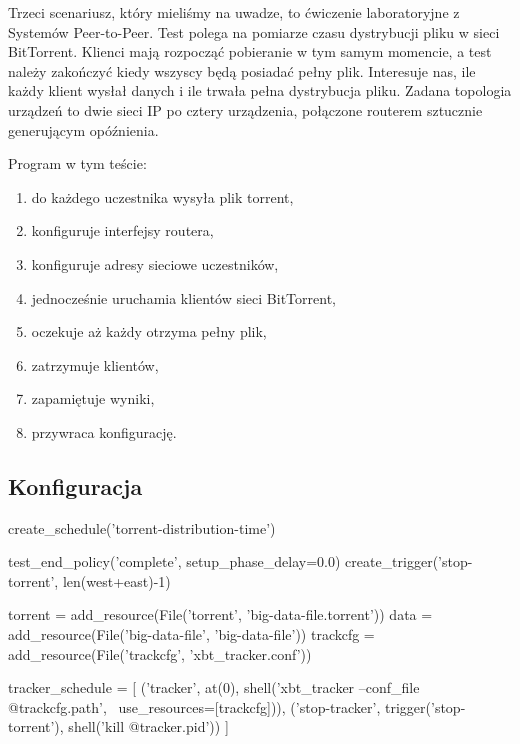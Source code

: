 \documentclass[00-praca-magisterska.tex]{subfiles}
\begin{document}

Trzeci scenariusz, który mieliśmy na uwadze, to ćwiczenie laboratoryjne z
Systemów Peer-to-Peer. Test polega na pomiarze czasu dystrybucji pliku w sieci
BitTorrent. Klienci mają rozpocząć pobieranie w tym samym momencie, a test należy
zakończyć kiedy wszyscy będą posiadać pełny plik. Interesuje nas, ile każdy
klient wysłał danych i ile trwała pełna dystrybucja pliku. Zadana topologia
urządzeń to dwie sieci IP po cztery urządzenia, połączone routerem sztucznie
generującym opóźnienia.

Program w tym teście:
\begin{enumerate}
\item do każdego uczestnika wysyła plik torrent,
\item konfiguruje interfejsy routera,
\item konfiguruje adresy sieciowe uczestników,
\item jednocześnie uruchamia klientów sieci BitTorrent,
\item oczekuje aż każdy otrzyma pełny plik,
\item zatrzymuje klientów,
\item zapamiętuje wyniki,
\item przywraca konfigurację.
\end{enumerate}

\subsection{Konfiguracja}




\begin{pythoncode}
  create_schedule('torrent-distribution-time')
    
  test_end_policy('complete', setup_phase_delay=0.0)
  create_trigger('stop-torrent', len(west+east)-1)
\end{pythoncode}

\begin{pythoncode}
  torrent = add_resource(File('torrent', 'big-data-file.torrent'))
  data    = add_resource(File('big-data-file',    'big-data-file'))
  trackcfg = add_resource(File('trackcfg', 'xbt_tracker.conf'))
\end{pythoncode}

\begin{pythoncode}
  tracker_schedule = [
      ('tracker', at(0), shell('xbt_tracker --conf_file @{trackcfg.path}', \
          use_resources=[trackcfg])),
      ('stop-tracker', trigger('stop-torrent'), shell('kill @{tracker.pid}'))
  ]
\end{pythoncode}
\end{document}
